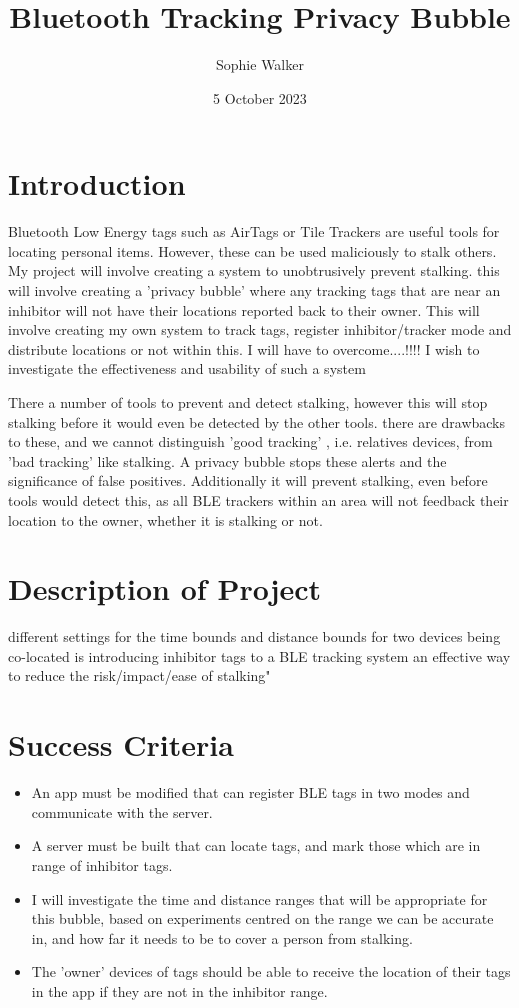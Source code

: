 \documentclass[12pt]{article}
\begin{document}
\title{Bluetooth Tracking Privacy Bubble}
\author{Sophie Walker}
\date{5 October 2023}
\maketitle
\thispagestyle{empty}
\section{Introduction}


Bluetooth Low Energy tags such as AirTags or Tile Trackers are useful tools for locating personal items. However, these can be used maliciously to stalk others. 
 My project will involve creating a system to unobtrusively prevent stalking. this will involve creating a 'privacy bubble' where any tracking tags that are near an inhibitor will not have their locations reported back to their owner.
This will involve creating my own system to track tags, register inhibitor/tracker mode and distribute locations or not within this. I will have to overcome....!!!!
I wish to investigate the effectiveness and usability of such a system

There a number of tools to prevent and detect stalking, however this will stop stalking before it would even be detected by the other tools.            there are drawbacks to these, and we cannot distinguish 'good tracking' , i.e. relatives  devices, from 'bad tracking' like stalking. A privacy bubble stops these alerts and the significance of false positives.
Additionally it will prevent stalking, even before tools would detect this, as all BLE trackers within an area will  not feedback their location to the owner, whether it is stalking or not.


\section{Description of Project}
different settings for the time bounds and distance bounds for two devices being co-located
is introducing inhibitor tags to a BLE tracking system an effective way to reduce the risk/impact/ease of stalking"

\section{Success Criteria}
\begin{itemize}
\item{An app must be modified that can register BLE tags in two modes and communicate with the server.}
\item{A server must be built that can locate tags, and mark those which are in range of inhibitor tags.}
\item{I will investigate the time and distance ranges that will be appropriate for this bubble, based on experiments centred on the range we can be accurate in, and how far it needs to be to cover a person from stalking.}
\item{The 'owner' devices of tags should be able to receive the location of their tags in the app if they are not in the inhibitor range.}
\end{itemize}
\end{document}
